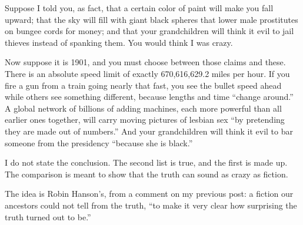 
Suppose I told you, as fact, that a certain color of paint will make you fall upward; that the sky will fill with giant black spheres that lower male prostitutes on bungee cords for money; and that your grandchildren will think it evil to jail thieves instead of spanking them. You would think I was crazy.

Now suppose it is 1901, and you must choose between those claims and these. There is an absolute speed limit of exactly 670,616,629.2 miles per hour. If you fire a gun from a train going nearly that fast, you see the bullet speed ahead while others see something different, because lengths and time ``change around.'' A global network of billions of adding machines, each more powerful than all earlier ones together, will carry moving pictures of lesbian sex ``by pretending they are made out of numbers.'' And your grandchildren will think it evil to bar someone from the presidency ``because she is black.'' 

I do not state the conclusion. The second list is true, and the first is made up. The comparison is meant to show that the truth can sound as crazy as fiction. 

The idea is Robin Hanson's, from a comment on my previous post: a fiction our ancestors could not tell from the truth, ``to make it very clear how surprising the truth turned out to be.''
